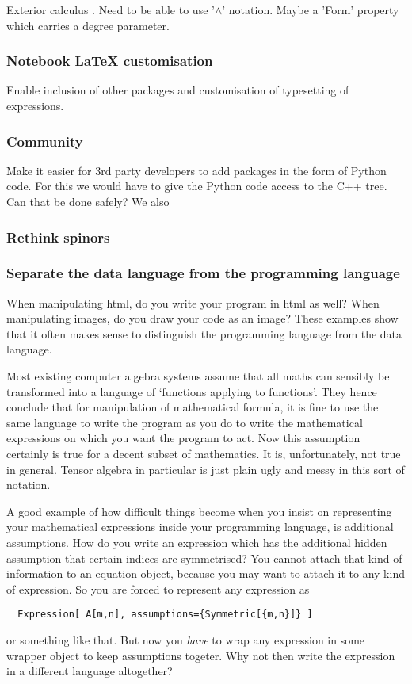 \documentclass[11pt]{article}
\begin{document}
Exterior calculus \cite{xTerior}. Need to be able to use '$\wedge$'
notation. Maybe a 'Form' property which carries a degree parameter.


\subsubsection{Notebook \LaTeX{} customisation}

Enable inclusion of other packages and customisation of typesetting of expressions.

\subsubsection{Community}

Make it easier for 3rd party developers to add packages in the form of
Python code. For this we would have to give the Python code access to
the C++ tree. Can that be done safely? We also 

\subsubsection{Rethink spinors}

\subsubsection{Separate the data language from the programming language}

When manipulating html, do you write your program in html as well?
When manipulating images, do you draw your code as an image? These
examples show that it often makes sense to distinguish the programming
language from the data language.

Most existing computer algebra systems assume that all maths can
sensibly be transformed into a language of `functions applying to
functions'. They hence conclude that for manipulation of mathematical
formula, it is fine to use the same language to write the program as
you do to write the mathematical expressions on which you want the
program to act. Now this assumption certainly is true for a decent
subset of mathematics. It is, unfortunately, not true in
general. Tensor algebra in particular is just plain ugly and messy in
this sort of notation.

A good example of how difficult things become when you insist on 
representing your mathematical expressions inside your programming language,
is additional assumptions. How do you write an expression which has the
additional hidden assumption that certain indices are symmetrised? 
You cannot attach that kind of information to an equation object, because you may 
want to attach it to any kind of expression. So you are forced to represent
any expression as
\begin{verbatim}
  Expression[ A[m,n], assumptions={Symmetric[{m,n}]} ]
\end{verbatim}
or something like that. But now you \emph{have} to wrap any expression
in some wrapper object to keep assumptions togeter. Why not then write
the expression in a different language altogether?
\end{document}
